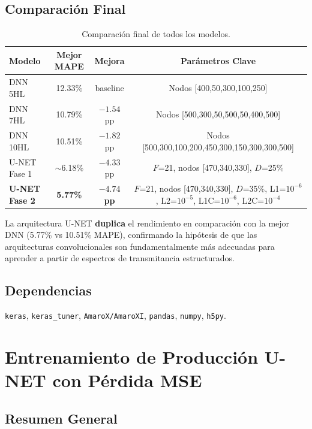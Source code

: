\documentclass{article}
\begin{document}
\subsection{Comparación Final}

\begin{table}[htbp]
\centering
\caption{Comparación final de todos los modelos.}
\label{tab:final-compare}
\begin{tabular}{lccc}
\hline
Modelo & Mejor MAPE & Mejora & Parámetros Clave \\
\hline
DNN 5HL      & 12.33\% & baseline   & Nodos [400,50,300,100,250] \\
DNN 7HL      & 10.79\% & $-1.54$ pp & Nodos [500,300,50,500,50,400,500] \\
DNN 10HL     & 10.51\% & $-1.82$ pp & Nodos [500,300,100,200,450,300,150,300,300,500] \\
U-NET Fase 1 & $\sim$6.18\% & $-4.33$ pp & $F$=21, nodos [470,340,330], $D$=25\% \\
\textbf{U-NET Fase 2} & \textbf{5.77\%} & \textbf{$-4.74$ pp} & $F$=21, nodos [470,340,330], $D$=35\%, L1=$10^{-6}$, L2=$10^{-5}$, L1C=$10^{-6}$, L2C=$10^{-4}$ \\
\hline
\end{tabular}
\end{table}

La arquitectura U-NET \textbf{duplica} el rendimiento en comparación con la mejor DNN (5.77\% vs 10.51\% MAPE), confirmando la hipótesis de que las arquitecturas convolucionales son fundamentalmente más adecuadas para aprender a partir de espectros de transmitancia estructurados.

\subsection{Dependencias}
\texttt{keras}, \texttt{keras\_tuner}, \texttt{AmaroX/AmaroXI}, \texttt{pandas}, \texttt{numpy}, \texttt{h5py}.

\newpage

\section{Entrenamiento de Producción U-NET con Pérdida MSE}
\label{sec:prod-training}

\subsection{Resumen General}
\end{document}
